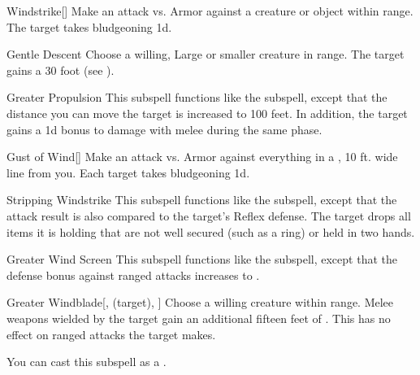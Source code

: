 \begin{ability}[\nth{1}]{Windstrike}[]
Make an attack vs. Armor against a creature or object within \rngmed range.
\hit The target takes bludgeoning  \plus1d.
\end{ability}
\vspace{0.25em}


\begin{ability}[\nth{2}]{Gentle Descent}
Choose a willing, Large or smaller creature in \rngclose range.
The target gains a 30 foot  (see ).
\end{ability}
\vspace{0.25em}


\begin{ability}[\nth{2}]{Greater Propulsion}
This subspell functions like the  subspell, except that the distance you can move the target is increased to 100 feet.
In addition, the target gains a \plus1d bonus to damage with melee  during the same phase.
\end{ability}
\vspace{0.25em}


\begin{ability}[\nth{2}]{Gust of Wind}[]
Make an attack vs. Armor against everything in a \arealarge, 10 ft. wide line from you.
\hit Each target takes bludgeoning  \minus1d.
\end{ability}
\vspace{0.25em}


\begin{ability}[\nth{2}]{Stripping Windstrike}
This subspell functions like the  subspell, except that the attack result is also compared to the target's Reflex defense.
\hit The target drops all items it is holding that are not well secured (such as a ring) or held in two hands.
\end{ability}
\vspace{0.25em}


\begin{ability}[\nth{3}]{Greater Wind Screen}
This subspell functions like the  subspell, except that the defense bonus against ranged attacks increases to .
\end{ability}
\vspace{0.25em}


\begin{ability}[\nth{3}]{Greater Windblade}[,  (target), ]
Choose a willing creature within \rngclose range.
Melee weapons wielded by the target gain an additional fifteen feet of .
This has no effect on ranged attacks the target makes.

You can cast this subspell as a .
\end{ability}
\vspace{0.25em}


